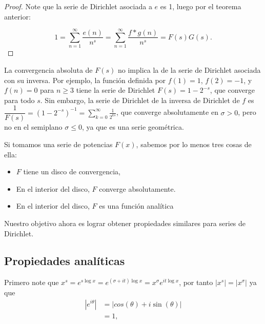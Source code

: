 \begin{proof}
Note que la serie de Dirichlet asociada a $e$ es 1, luego por el teorema anterior:

$$1=\sum_{n=1}^{\infty} \frac{e(n)}{n^s}=\sum_{n=1}^{\infty} \frac{f*g(n)}{n^s}=F(s)G(s).$$
\end{proof}

\begin{note}
La convergencia absoluta de \( F(s) \) no implica la de la serie de Dirichlet asociada con su inversa. Por ejemplo, la función definida por \( f(1)=1 \), \( f(2)=-1 \), y \( f(n)=0 \) para \( n \geq 3 \) tiene la serie de Dirichlet \( F(s)=1-2^{-s} \), que converge para todo $s$. Sin embargo, la serie de Dirichlet de la inversa de Dirichlet de \( f \) es \( \dfrac{1}{F(s)} = (1-2^{-s})^{-1} = \displaystyle\sum_{k=0}^{\infty} \frac{1}{2^{ks}} \), que converge absolutamente en \( \sigma > 0 \), pero no en el semiplano \( \sigma \leq 0 \), ya que es una serie geométrica. \cite{hildebrand2006introduction}\\
\end{note}

Si tomamos una serie de potencias $F(x)$, sabemos por lo menos tres cosas de ella:

\begin{itemize}[label=$\bullet$]
    \item $F$ tiene un disco de convergencia, 

    \item En el interior del disco, $F$ converge absolutamente.

    \item En el interior del disco, $F$ es una función analítica \cite{Apostol:105425}
\end{itemize}

Nuestro objetivo ahora es lograr obtener propiedades similares para series de Dirichlet.
\subsection{Propiedades analíticas}

Primero note que $\displaystyle x^{\displaystyle  s}=e^{\displaystyle s\log x}=e^{\displaystyle(\sigma+it)\log x}=x^{\displaystyle\sigma}e^{\displaystyle it\log{x}}$, por tanto $|\displaystyle x^{\displaystyle s}|=|x^{\displaystyle\sigma}|$ ya que
\begin{align*}
     \left|e^{ i\theta}\right|&=|cos(\theta)+i\sin(\theta)|\\
     &=1
 ,\end{align*} 

